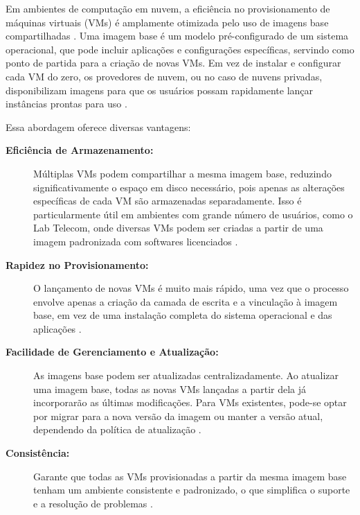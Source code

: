 Em ambientes de computação em nuvem, a eficiência no provisionamento de máquinas virtuais (VMs) é amplamente otimizada pelo uso de imagens base compartilhadas \cite{jin2009}. Uma imagem base é um modelo pré-configurado de um sistema operacional, que pode incluir aplicações e configurações específicas, servindo como ponto de partida para a criação de novas VMs. Em vez de instalar e configurar cada VM do zero, os provedores de nuvem, ou no caso de nuvens privadas, disponibilizam imagens para que os usuários possam rapidamente lançar instâncias prontas para uso \cite{jin2009}.

Essa abordagem oferece diversas vantagens:

\begin{description}
    \item[\textbf{Eficiência de Armazenamento:}] Múltiplas VMs podem compartilhar a mesma imagem base, reduzindo significativamente o espaço em disco necessário, pois apenas as alterações específicas de cada VM são armazenadas separadamente. Isso é particularmente útil em ambientes com grande número de usuários, como o Lab Telecom, onde diversas VMs podem ser criadas a partir de uma imagem padronizada com softwares licenciados \cite{jin2009}.
    \item[\textbf{Rapidez no Provisionamento:}] O lançamento de novas VMs é muito mais rápido, uma vez que o processo envolve apenas a criação da camada de escrita e a vinculação à imagem base, em vez de uma instalação completa do sistema operacional e das aplicações \cite{jin2009}.
    \item[\textbf{Facilidade de Gerenciamento e Atualização:}] As imagens base podem ser atualizadas centralizadamente. Ao atualizar uma imagem base, todas as novas VMs lançadas a partir dela já incorporarão as últimas modificações. Para VMs existentes, pode-se optar por migrar para a nova versão da imagem ou manter a versão atual, dependendo da política de atualização \cite{jin2009}.
    \item[\textbf{Consistência:}] Garante que todas as VMs provisionadas a partir da mesma imagem base tenham um ambiente consistente e padronizado, o que simplifica o suporte e a resolução de problemas \cite{jin2009}.
\end{description}